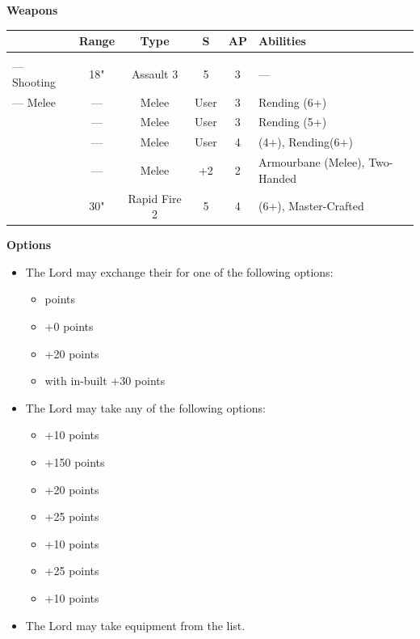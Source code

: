 \begin{minipage}[t]{0.72\textwidth}
	\vspace*{2em}
	\textbf{Weapons}
	
	\begin{tabular}{m{95 pt} *{4}{c} >{\raggedright\arraybackslash}p{130pt}}
		& Range & Type & S & AP & Abilities \\
		\hline
		\quickref{Staff of Light} & & &  &  &  \\
		— Shooting & 18" & Assault 3 & 5 & 3 & — \\
		— Melee & — & Melee & User & 3 & Rending (6+) \\
		\quickref{Hyperphase Sword} & — & Melee & User & 3 & Rending (5+) \\
		\quickref{Voidblade} & — & Melee & User & 4 & \quickref{Entropic Strike} (4+), Rending(6+) \\
		\quickref{Warscythe} & — & Melee & +2 & 2 & Armourbane (Melee), Two-Handed \\
		\quickref{Relic Gauss Blaster} & 30" & Rapid Fire 2 & 5 & 4 & \quickref{Gauss} (6+), Master-Crafted \\
	\end{tabular}
	
	\vspace*{2em}
	\textbf{Options}
	\begin{itemize}
		\item The Lord may exchange their  for one of the following options:
		\begin{itemize}			
			\item {}  points
			\item {} \dotfill +0 points
			\item {} \dotfill +20 points
			\item {} with in-built  \dotfill +30 points
		\end{itemize}
		\item The Lord may take any of the following options:
		\begin{itemize}
			\item {} \dotfill +10 points
			\item {} \dotfill +150 points
			\item {} \dotfill +20 points
			\item {} \dotfill +25 points
			\item {} \dotfill +10 points
			\item {} \dotfill +25 points
			\item {} \dotfill +10 points
		\end{itemize}
		\item The Lord may take equipment from the  list.
	\end{itemize}
\end{minipage}



